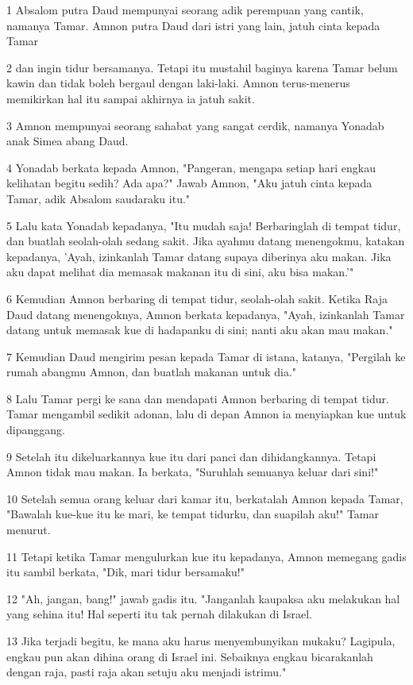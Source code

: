 \par 1 Absalom putra Daud mempunyai seorang adik perempuan yang cantik, namanya Tamar. Amnon putra Daud dari istri yang lain, jatuh cinta kepada Tamar
\par 2 dan ingin tidur bersamanya. Tetapi itu mustahil baginya karena Tamar belum kawin dan tidak boleh bergaul dengan laki-laki. Amnon terus-menerus memikirkan hal itu sampai akhirnya ia jatuh sakit.
\par 3 Amnon mempunyai seorang sahabat yang sangat cerdik, namanya Yonadab anak Simea abang Daud.
\par 4 Yonadab berkata kepada Amnon, "Pangeran, mengapa setiap hari engkau kelihatan begitu sedih? Ada apa?" Jawab Amnon, "Aku jatuh cinta kepada Tamar, adik Absalom saudaraku itu."
\par 5 Lalu kata Yonadab kepadanya, "Itu mudah saja! Berbaringlah di tempat tidur, dan buatlah seolah-olah sedang sakit. Jika ayahmu datang menengokmu, katakan kepadanya, 'Ayah, izinkanlah Tamar datang supaya diberinya aku makan. Jika aku dapat melihat dia memasak makanan itu di sini, aku bisa makan.'"
\par 6 Kemudian Amnon berbaring di tempat tidur, seolah-olah sakit. Ketika Raja Daud datang menengoknya, Amnon berkata kepadanya, "Ayah, izinkanlah Tamar datang untuk memasak kue di hadapanku di sini; nanti aku akan mau makan."
\par 7 Kemudian Daud mengirim pesan kepada Tamar di istana, katanya, "Pergilah ke rumah abangmu Amnon, dan buatlah makanan untuk dia."
\par 8 Lalu Tamar pergi ke sana dan mendapati Amnon berbaring di tempat tidur. Tamar mengambil sedikit adonan, lalu di depan Amnon ia menyiapkan kue untuk dipanggang.
\par 9 Setelah itu dikeluarkannya kue itu dari panci dan dihidangkannya. Tetapi Amnon tidak mau makan. Ia berkata, "Suruhlah semuanya keluar dari sini!"
\par 10 Setelah semua orang keluar dari kamar itu, berkatalah Amnon kepada Tamar, "Bawalah kue-kue itu ke mari, ke tempat tidurku, dan suapilah aku!" Tamar menurut.
\par 11 Tetapi ketika Tamar mengulurkan kue itu kepadanya, Amnon memegang gadis itu sambil berkata, "Dik, mari tidur bersamaku!"
\par 12 "Ah, jangan, bang!" jawab gadis itu. "Janganlah kaupaksa aku melakukan hal yang sehina itu! Hal seperti itu tak pernah dilakukan di Israel.
\par 13 Jika terjadi begitu, ke mana aku harus menyembunyikan mukaku? Lagipula, engkau pun akan dihina orang di Israel ini. Sebaiknya engkau bicarakanlah dengan raja, pasti raja akan setuju aku menjadi istrimu."
